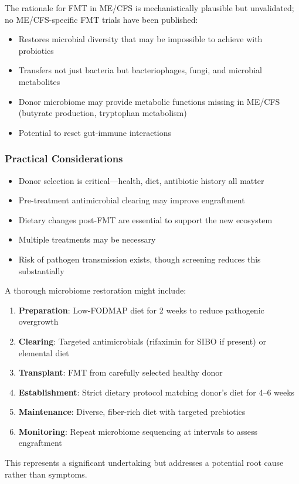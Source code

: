 The rationale for FMT in ME/CFS is mechanistically plausible but unvalidated; no ME/CFS-specific FMT trials have been published:

\begin{itemize}
    \item Restores microbial diversity that may be impossible to achieve with probiotics
    \item Transfers not just bacteria but bacteriophages, fungi, and microbial metabolites
    \item Donor microbiome may provide metabolic functions missing in ME/CFS (butyrate production, tryptophan metabolism)
    \item Potential to reset gut-immune interactions
\end{itemize}

\subsubsection{Practical Considerations}

\begin{itemize}
    \item Donor selection is critical---health, diet, antibiotic history all matter
    \item Pre-treatment antimicrobial clearing may improve engraftment
    \item Dietary changes post-FMT are essential to support the new ecosystem
    \item Multiple treatments may be necessary
    \item Risk of pathogen transmission exists, though screening reduces this substantially
\end{itemize}

\begin{speculation}
A thorough microbiome restoration might include:
\begin{enumerate}
    \item \textbf{Preparation}: Low-FODMAP diet for 2 weeks to reduce pathogenic overgrowth
    \item \textbf{Clearing}: Targeted antimicrobials (rifaximin for SIBO if present) or elemental diet
    \item \textbf{Transplant}: FMT from carefully selected healthy donor
    \item \textbf{Establishment}: Strict dietary protocol matching donor's diet for 4--6 weeks
    \item \textbf{Maintenance}: Diverse, fiber-rich diet with targeted prebiotics
    \item \textbf{Monitoring}: Repeat microbiome sequencing at intervals to assess engraftment
\end{enumerate}
This represents a significant undertaking but addresses a potential root cause rather than symptoms.
\end{speculation}

